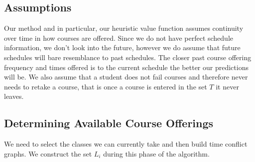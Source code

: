 \documentclass[11pt]{article} %
\begin{document}
\subsection{Assumptions} Our method and in particular, our heuristic value
function assumes continuity over time in how courses are offered. Since we do
not have perfect schedule information, we don't look into the future, however we
do assume that future schedules will bare resemblance to past schedules. The
closer past course offering frequency and times offered is to the current
schedule the better our predictions will be. We also assume that a student does
not fail courses and therefore never needs to retake a course, that is once
a course is entered in the set $T$ it never leaves.

\subsection{Determining Available Course Offerings} We need to select the
classes we can currently take and then build time conflict graphs.
We construct the set $L_i$ during this phase of the algorithm.
\end{document}
